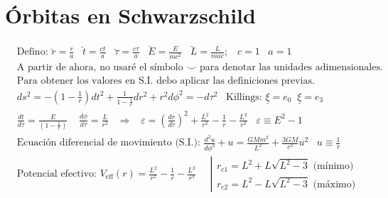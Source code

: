 \section*{Órbitas en Schwarzschild }
\begin{align*}
&\text{Defino: }\breve{r}=\frac{r}{a}\; \; \; \breve{t}=\frac{ct}{a}\; \; \; \breve{\tau}=\frac{c\tau}{a}\; \; \; \breve{E}=\frac{E}{mc^2}\; \; \; \breve{L}=\frac{L}{mac};\; \;\; c=1 \; \; \; a=1\\
&\text{A partir de ahora, no usaré el símbolo $\smallsmile$  para denotar las unidades adimensionales.}\\
&\text{Para obtener los valores en S.I. debo aplicar las definiciones previas.}\\
&ds^2 = -\left(1-\frac{1}{r}\right)dt^2 + \frac{1}{1-\frac{1}{r}}dr^2 + r^2 d\phi^2=-d\tau^2 \; \;\;  \text{Killings: }\underline{\xi}=e_0\; \; \underline{\xi}=e_3\\
&\frac{dt}{d\tau}= \frac{E}{(1-\frac{1}{r})}\; \; \; \; \frac{d\phi}{d\tau}= \frac{L}{r^2}\;\; \; \Rightarrow \; \; \; \varepsilon = \left(\frac{dr}{d\tau}\right)^2 + \frac{L^2}{r^2 }- \frac{1}{r}- \frac{L^2}{r^3}\; \; \; \varepsilon\equiv E^2 -1\\
&\text{Ecuación diferencial de movimiento (S.I.): }\frac{d^2 u}{d\phi^2 }+ u = \frac{GMm^2 }{L^2}+ \frac{3GM}{c^2}u^2\; \; \; u\equiv\frac{1}{r}\\
&\text{Potencial efectivo: }V_{\text{eff}}(r)= \frac{L^2}{r^2}-\frac{1}{r}-\frac{L^2}{r^3}\; \;\;\;  \; 
\left|
\begin{array}{l}
r_{\text{c}1} = L^2+L\sqrt{L^2-3}\text{ (mínimo)}\\
 r_{\text{c}2} = L^2-L\sqrt{L^2-3} \text{ (máximo)}
\end{array}
\right.
\end{align*}
